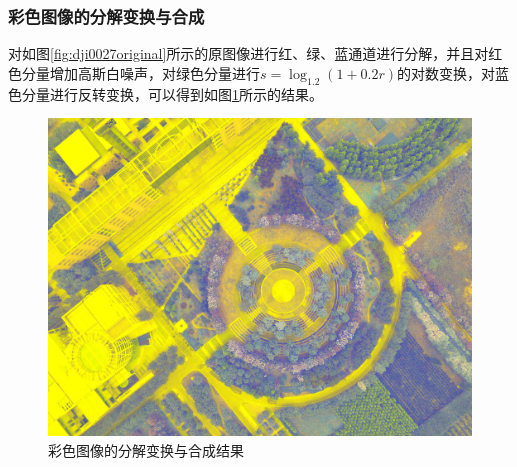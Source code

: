\subsubsection{彩色图像的分解变换与合成}
对如图\ref{fig:dji0027original}所示的原图像进行红、绿、蓝通道进行分解，并且对红色分量增加高斯白噪声，对绿色分量进行$s=\log_{1.2}(1+0.2r)$的对数变换，对蓝色分量进行反转变换，可以得到如图\ref{fig:dji0027color_transform_fusion}所示的结果。
\begin{figure}[H]
	\centering
	\includegraphics[width=0.7\linewidth]{figure/DJI_0027_Transformed_Fusion.png}
	\caption{彩色图像的分解变换与合成结果}
	\label{fig:dji0027color_transform_fusion}
\end{figure}

